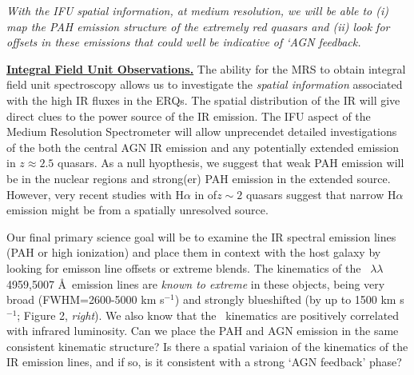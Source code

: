 \smallskip
\smallskip
\noindent
{\it With the IFU spatial information, at medium resolution, we will be able to 
(i) map the PAH emission structure of the extremely red quasars and (ii) look 
for offsets in these emissions that could well be indicative of `AGN feedback.}

\smallskip
\smallskip
\noindent
{\bf \underline{Integral Field Unit Observations.}}
The ability for the MRS to obtain integral field unit spectroscopy
allows us to investigate the {\it spatial information} associated with
the high IR fluxes in the ERQs. The spatial distribution of the IR
will give direct clues to the power source of the IR emission.  The
IFU aspect of the Medium Resolution Spectrometer will allow
unprecendet detailed investigations of the both the central AGN IR
emission and any potentially extended emission in $z\approx2.5$
quasars.  As a null hyopthesis, we suggest that weak PAH emission will
be in the nuclear regions and strong(er) PAH emission in the extended
source. However, very recent studies with H$\alpha$ in of$z\sim2$
quasars suggest that narrow H$\alpha$ emission might be from a
spatially unresolved source.

\smallskip \smallskip
\noindent 
Our final primary science goal will be to examine the IR spectral
emission lines (PAH or high ionization) and place them in context with
the host galaxy by looking for emisson line offsets or extreme blends.
The kinematics of the \oiii\ $\lambda \lambda$4959,5007 \AA\ emission
lines are {\it known to extreme} in these objects, being very broad
(FWHM=2600-5000 km s$^{-1}$) and strongly blueshifted (by up to 1500
km s$^{-1}$; Figure 2, {\it right}). We also know that the \oiii\
kinematics are positively correlated with infrared luminosity.  Can we
place the PAH and AGN emission in the same consistent kinematic
structure?  Is there a spatial variaion of the kinematics of the IR
emission lines, and if so, is it consistent with a strong `AGN
feedback' phase?

